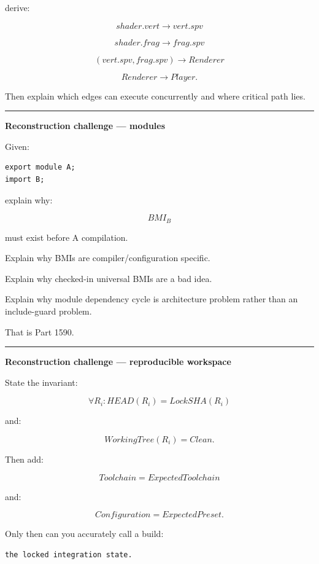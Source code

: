 derive:

\[
shader.vert
\rightarrow
vert.spv
\]

\[
shader.frag
\rightarrow
frag.spv
\]

\[
(vert.spv,frag.spv)
\rightarrow
Renderer
\]

\[
Renderer
\rightarrow
Player.
\]

Then explain which edges can execute concurrently and where critical path lies.

\begin{center}\rule{0.5\linewidth}{0.5pt}\end{center}

\textbf{Reconstruction challenge --- modules}

Given:

\begin{verbatim}
export module A;
import B;
\end{verbatim}

explain why:

\[
BMI_B
\]

must exist before A compilation.

Explain why BMIs are compiler/configuration specific.

Explain why checked-in universal BMIs are a bad idea.

Explain why module dependency cycle is architecture problem rather than an include-guard problem.

That is Part 1590.

\begin{center}\rule{0.5\linewidth}{0.5pt}\end{center}

\textbf{Reconstruction challenge --- reproducible workspace}

State the invariant:

\[
\forall R_i:
HEAD(R_i)=LockSHA(R_i)
\]

and:

\[
WorkingTree(R_i)=Clean.
\]

Then add:

\[
Toolchain
=
ExpectedToolchain
\]

and:

\[
Configuration
=
ExpectedPreset.
\]

Only then can you accurately call a build:

\begin{verbatim}
the locked integration state.
\end{verbatim}

